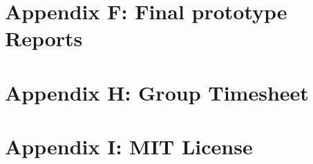\documentclass[12pt]{witseiepaper}
\begin{document}
\newpage
\section{Appendix F: Final prototype Reports}


\newpage
\section{Appendix H: Group Timesheet}


\newpage
\section{Appendix I: MIT License}

\end{document}
